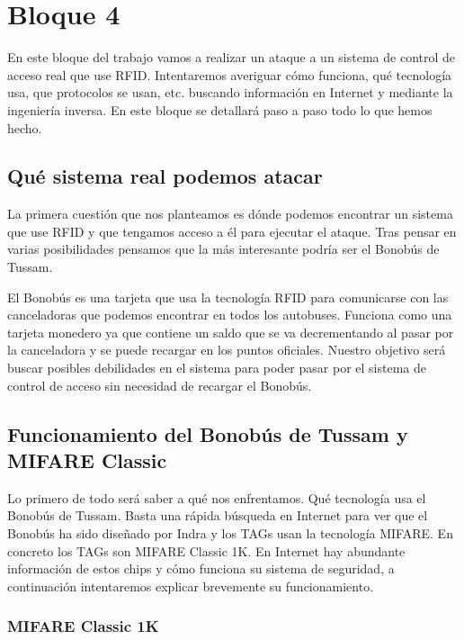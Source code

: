 \section{Bloque 4}\label{bloque-4}

En este bloque del trabajo vamos a realizar un ataque a un sistema de
control de acceso real que use RFID. Intentaremos averiguar cómo
funciona, qué tecnología usa, que protocolos se usan, etc. buscando
información en Internet y mediante la ingeniería inversa. En este bloque
se detallará paso a paso todo lo que hemos hecho.

\subsection{Qué sistema real podemos
atacar}\label{quuxe9-sistema-real-podemos-atacar}

La primera cuestión que nos planteamos es dónde podemos encontrar un
sistema que use RFID y que tengamos acceso a él para ejecutar el ataque.
Tras pensar en varias posibilidades pensamos que la más interesante
podría ser el Bonobús de Tussam.

El Bonobús es una tarjeta que usa la tecnología RFID para comunicarse
con las canceladoras que podemos encontrar en todos los autobuses.
Funciona como una tarjeta monedero ya que contiene un saldo que se va
decrementando al pasar por la canceladora y se puede recargar en los
puntos oficiales. Nuestro objetivo será buscar posibles debilidades en
el sistema para poder pasar por el sistema de control de acceso sin
necesidad de recargar el Bonobús.

\subsection{Funcionamiento del Bonobús de Tussam y MIFARE
Classic}\label{funcionamiento-del-bonobuxfas-de-tussam-y-mifare-classic}

Lo primero de todo será saber a qué nos enfrentamos. Qué tecnología usa
el Bonobús de Tussam. Basta una rápida búsqueda en Internet para ver que
el Bonobús ha sido diseñado por Indra y los TAGs usan la tecnología
MIFARE. En concreto los TAGs son MIFARE Classic 1K. En Internet hay
abundante información de estos chips y cómo funciona su sistema de
seguridad, a continuación intentaremos explicar brevemente su
funcionamiento.

\subsubsection{MIFARE Classic 1K}\label{mifare-classic-1k}

